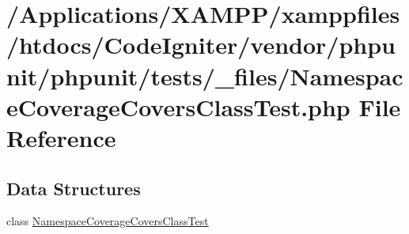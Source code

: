 \hypertarget{phpunit_2tests_2__files_2_namespace_coverage_covers_class_test_8php}{}\section{/\+Applications/\+X\+A\+M\+P\+P/xamppfiles/htdocs/\+Code\+Igniter/vendor/phpunit/phpunit/tests/\+\_\+files/\+Namespace\+Coverage\+Covers\+Class\+Test.php File Reference}
\label{phpunit_2tests_2__files_2_namespace_coverage_covers_class_test_8php}
\subsection*{Data Structures}
\begin{DoxyCompactItemize}
\item 
class \mbox{\hyperlink{class_namespace_coverage_covers_class_test}{Namespace\+Coverage\+Covers\+Class\+Test}}
\end{DoxyCompactItemize}
